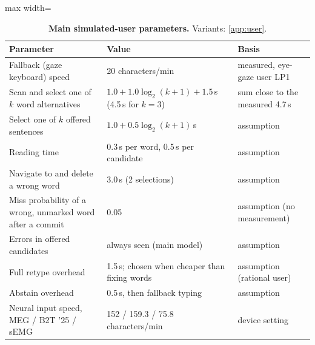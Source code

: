 \begin{table}[H]
  \centering
  \caption{\textbf{Main simulated-user parameters.} Variants: \cref{app:user}.}
  \label{tab:user}
  \small
  \begin{adjustbox}{max width=\linewidth}\begin{tabular}{@{}lll@{}}
    \toprule
    \textbf{Parameter} & \textbf{Value} & \textbf{Basis} \\
    \midrule
    Fallback (gaze keyboard) speed & 20 characters/min & measured, eye-gaze user LP1 \citep{cai2024gaze} \\
    Scan and select one of $k$ word alternatives & $1.0 + 1.0\log_2(k+1) + 1.5$\,s (4.5\,s for $k = 3$) & sum close to the measured 4.7\,s \citep{cai2024gaze} \\
    Select one of $k$ offered sentences & $1.0 + 0.5\log_2(k+1)$\,s & assumption \\
    Reading time & 0.3\,s per word, 0.5\,s per candidate & assumption \\
    Navigate to and delete a wrong word & 3.0\,s (2 selections) & assumption \\
    Miss probability of a wrong, unmarked word after a commit & 0.05 & assumption (no measurement) \\
    Errors in offered candidates & always seen (main model) & assumption \\
    Full retype overhead & 1.5\,s; chosen when cheaper than fixing words & assumption (rational user) \\
    Abstain overhead & 0.5\,s, then fallback typing & assumption \\
    Neural input speed, MEG / B2T '25 / sEMG & 152 / 159.3 / 75.8 characters/min & device setting \\
    \bottomrule
  \end{tabular}\end{adjustbox}
\end{table}
